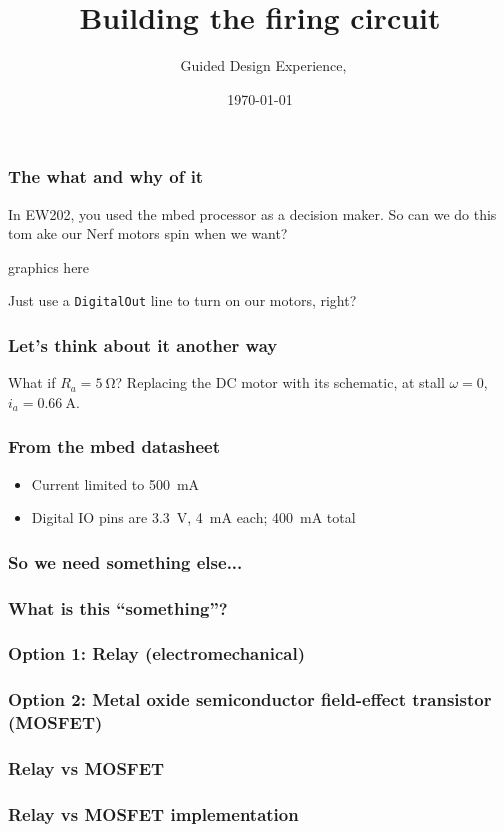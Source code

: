 \documentclass[aspectratio=169]{beamer}
\title{Building the firing circuit}
\subtitle{\usnaCourseNumber\ Guided Design Experience, \usnaCourseTerm}
\author{\usnaInstructorShort}
\date{\today}
\begin{document}
\settitlebg
\begin{frame}
\titlepage
\end{frame}

\setslidebg
\begin{frame}
\frametitle{The what and why of it}
In EW202, you used the mbed processor as a decision maker. So can we do this tom ake our Nerf motors spin when we want?
\begin{center}
graphics here
\end{center}
Just use a \lstinline{DigitalOut} line to turn on our motors, right? 
\end{frame}

\begin{frame}
\frametitle{Let's think about it another way}
What if $R_a=\SI{5}{\ohm}$? Replacing the DC motor with its schematic, at stall $\omega=0$, $i_a=\SI{0.66}{\ampere}$. 
\end{frame}

\begin{frame}
\frametitle{From the mbed datasheet}
\begin{itemize}
\item Current limited to \SI{500}{\milli\ampere}
\item Digital IO pins are \SI{3.3}{\volt}, \SI{4}{\milli\ampere} each; \SI{400}{\milli\ampere} total
\end{itemize}
\end{frame}

\begin{frame}
\frametitle{So we need something else...}
\end{frame}

\begin{frame}
\frametitle{What is this ``something''?}
\end{frame}

\begin{frame}
\frametitle{Option 1: Relay (electromechanical)}
\end{frame}

\begin{frame}
\frametitle{Option 2: Metal oxide semiconductor field-effect transistor ({MOSFET})}
\end{frame}

\begin{frame}
\frametitle{Relay vs {MOSFET}}
\end{frame}

\begin{frame}
\frametitle{Relay vs {MOSFET} implementation}
\end{frame}
\end{document}
